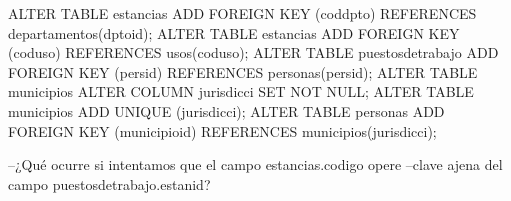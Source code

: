 \lstset{caption=Añadir claves ajenas,label=sql:crearForeignKey}
\begin{SQL}
ALTER TABLE estancias 
ADD FOREIGN KEY (coddpto) REFERENCES departamentos(dptoid);
ALTER TABLE estancias 
ADD FOREIGN KEY (coduso) REFERENCES usos(coduso);
ALTER TABLE puestosdetrabajo 
ADD FOREIGN KEY (persid) REFERENCES personas(persid);
ALTER TABLE municipios
   ALTER COLUMN jurisdicci SET NOT NULL;
ALTER TABLE municipios
  ADD UNIQUE (jurisdicci);
ALTER TABLE personas 
ADD FOREIGN KEY (municipioid) REFERENCES municipios(jurisdicci);

--¿Qué ocurre si intentamos que el campo estancias.codigo opere
--clave ajena del campo puestosdetrabajo.estanid?
\end{SQL}
